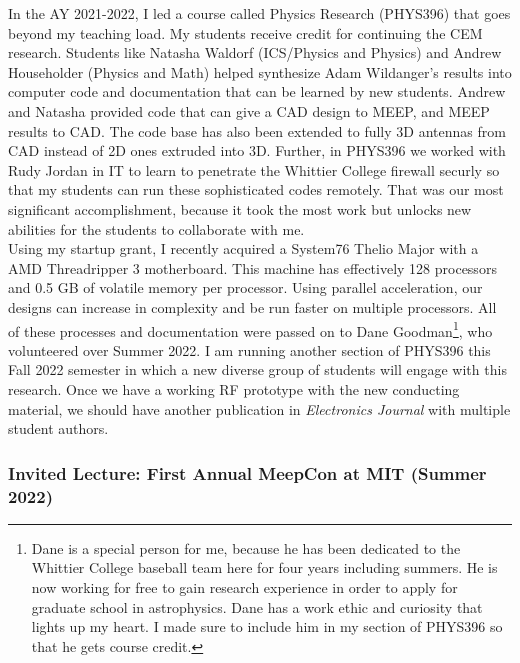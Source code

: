 \documentclass[../../../main.tex]{subfiles}
\begin{document}
In the AY 2021-2022, I led a course called Physics Research (PHYS396) that goes beyond my teaching load.  My students receive credit for continuing the CEM research.  Students like Natasha Waldorf (ICS/Physics and Physics) and Andrew Householder (Physics and Math) helped synthesize Adam Wildanger's results into computer code and documentation that can be learned by new students.  Andrew and Natasha provided code that can give a CAD design to MEEP, and MEEP results to CAD.  The code base has also been extended to fully 3D antennas from CAD instead of 2D ones extruded into 3D.  Further, in PHYS396 we worked with Rudy Jordan in IT to learn to penetrate the Whittier College firewall securly so that my students can run these sophisticated codes remotely.  That was our most significant accomplishment, because it took the most work but unlocks new abilities for the students to collaborate with me.
\\
\vspace{0.15cm}
Using my startup grant, I recently acquired a System76 Thelio Major with a AMD Threadripper 3 motherboard.  This machine has effectively 128 processors and 0.5 GB of volatile memory per processor.  Using parallel acceleration, our designs can increase in complexity and be run faster on multiple processors.  All of these processes and documentation were passed on to Dane Goodman\footnote{Dane is a special person for me, because he has been dedicated to the Whittier College baseball team here for four years including summers. He is now working for free to gain research experience in order to apply for graduate school in astrophysics.  Dane has a work ethic and curiosity that lights up my heart.  I made sure to include him in my section of PHYS396 so that he gets course credit.}, who volunteered over Summer 2022.  I am running another section of PHYS396 this Fall 2022 semester in which a new diverse group of students will engage with this research.  Once we have a working RF prototype with the new conducting material, we should have another publication in \textit{Electronics Journal} with multiple student authors.

\subsubsection{Invited Lecture: First Annual MeepCon at MIT (Summer 2022)}
\end{document}
